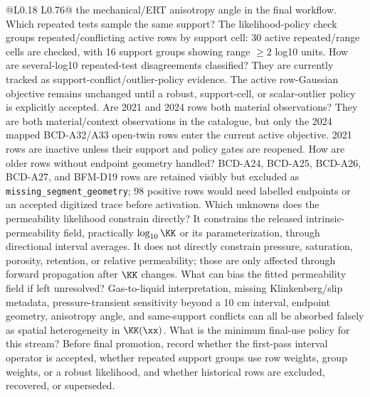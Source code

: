 \begin{longtable}{@{}L{0.18\textwidth} L{0.76\textwidth}@{}}
{the mechanical/ERT anisotropy angle in the final workflow.}
{ Which repeated tests sample the same support?}
{The likelihood-policy check groups repeated/conflicting active rows by support cell:
30 active repeated/range cells are checked, with 16 support groups showing range
\(\ge 2\) log10 units.}
{ How are several-log10 repeated-test disagreements classified?}
{They are currently tracked as support-conflict/outlier-policy evidence.  The active
row-Gaussian objective remains unchanged until a robust, support-cell, or
scalar-outlier policy is explicitly accepted.}
{ Are 2021 and 2024 rows both material observations?}
{They are both material/context observations in the catalogue, but only the 2024
mapped BCD-A32/A33 open-twin rows enter the current active objective.  2021 rows are
inactive unless their support and policy gates are reopened.}
{ How are older rows without endpoint geometry handled?}
{BCD-A24, BCD-A25, BCD-A26, BCD-A27, and BFM-D19 rows are retained visibly but
excluded as \texttt{missing\_segment\_geometry}; 98 positive rows would need labelled
endpoints or an accepted digitized trace before activation.}
{ Which unknowns does the permeability likelihood constrain directly?}
{It constrains the released intrinsic-permeability field, practically
\(\log_{10}\KK\) or its parameterization, through directional interval averages.
It does not directly constrain pressure, saturation, porosity, retention, or
relative permeability; those are only affected through forward propagation after
\(\KK\) changes.}
{ What can bias the fitted permeability field if left unresolved?}
{Gas-to-liquid interpretation, missing Klinkenberg/slip metadata, pressure-transient
sensitivity beyond a 10 cm interval, endpoint geometry, anisotropy angle, and
same-support conflicts can all be absorbed falsely as spatial heterogeneity in
\(\KK(\xx)\).}
{ What is the minimum final-use policy for this stream?}
{Before final promotion, record whether the first-pass interval operator is accepted,
whether repeated support groups use row weights, group weights, or a robust
likelihood, and whether historical rows are excluded, recovered, or superseded.}
\bottomrule
\end{longtable}

